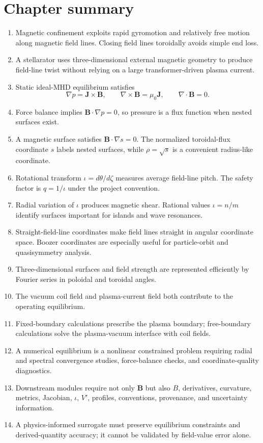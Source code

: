 \section{Chapter summary}
\label{sec:summary}

\begin{enumerate}[leftmargin=1.6em]
\item Magnetic confinement exploits rapid gyromotion and relatively free motion along magnetic field lines. Closing field lines toroidally avoids simple end loss.
\item A stellarator uses three-dimensional external magnetic geometry to produce field-line twist without relying on a large transformer-driven plasma current.
\item Static ideal-MHD equilibrium satisfies
\begin{equation*}
\nabla p=\mathbf J\times\mathbf B,
\qquad
\nabla\times\mathbf B=\mu_0\mathbf J,
\qquad
\nabla\cdot\mathbf B=0.
\end{equation*}
\item Force balance implies $\mathbf B\cdot\nabla p=0$, so pressure is a flux function when nested surfaces exist.
\item A magnetic surface satisfies $\mathbf B\cdot\nabla s=0$. The normalized toroidal-flux coordinate $s$ labels nested surfaces, while $\rho=\sqrt{s}$ is a convenient radius-like coordinate.
\item Rotational transform $\iota=d\theta/d\zeta$ measures average field-line pitch. The safety factor is $q=1/\iota$ under the project convention.
\item Radial variation of $\iota$ produces magnetic shear. Rational values $\iota=n/m$ identify surfaces important for islands and wave resonances.
\item Straight-field-line coordinates make field lines straight in angular coordinate space. Boozer coordinates are especially useful for particle-orbit and quasisymmetry analysis.
\item Three-dimensional surfaces and field strength are represented efficiently by Fourier series in poloidal and toroidal angles.
\item The vacuum coil field and plasma-current field both contribute to the operating equilibrium.
\item Fixed-boundary calculations prescribe the plasma boundary; free-boundary calculations solve the plasma-vacuum interface with coil fields.
\item A numerical equilibrium is a nonlinear constrained problem requiring radial and spectral convergence studies, force-balance checks, and coordinate-quality diagnostics.
\item Downstream modules require not only $\mathbf B$ but also $B$, derivatives, curvature, metrics, Jacobian, $\iota$, $V'$, profiles, conventions, provenance, and uncertainty information.
\item A physics-informed surrogate must preserve equilibrium constraints and derived-quantity accuracy; it cannot be validated by field-value error alone.
\end{enumerate}

